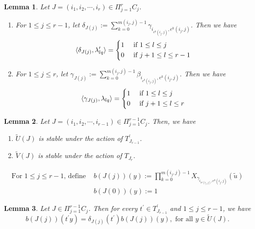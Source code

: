 \documentclass[10pt,a4paper]{amsart}
\newtheorem{lemma}{Lemma}
\begin{document}
\begin{lemma}\label{section:quotient:lemma 7}Let $J=(i_{1},i_{2},\cdots,i_{r})\in\Pi_{j=1}^{r}C_{j}$. 
	\begin{enumerate}
		\item 
		For $1\leq j\leq r-1$, 
		let $\delta_{J(j)}:=\sum_{k=0}^{m(i_{j},j)-1}\gamma_{i_{e^{k}(i_{j},j)},e^{k}(i_{j},j)}$. Then we have 
		\begin{align*}
			\langle\delta_{J(j)},\lambda^{\prime}_{lq}\rangle=\begin{dcases}
				1& \text{ if $1\leq l\leq j$}\\
				0& \text{ if $j+1\leq l\leq r-1$}
			\end{dcases}
		\end{align*}
		\item 	For $1\leq j\leq r$, 
		let $\gamma_{J(j)}:=\sum_{k=0}^{m(i_{j},j)-1}\beta_{i_{e^{k}(i_{j},j)},e^{k}(i_{j},j)}$. Then we have 
		\begin{align*}
			\langle\gamma_{J(j)},\lambda_{lq}\rangle=\begin{dcases}
				1& \text{ if $1\leq l\leq j$}\\
				0& \text{ if $j+1\leq l\leq r$}
			\end{dcases}
		\end{align*}
	\end{enumerate}
\end{lemma}

	\begin{lemma}\label{section: quotient lemma 5}
		Let	$J=(i_{1},i_{2},\cdots,i_{r-1})\in \Pi_{j=1}^{r-1}C_{j}$. Then, we have 
		\begin{enumerate}
			\item $\tilde{U}(J)$ is stable under the action of $T^{\prime}_{J_{r-1}}$.
			\item $\tilde{V}(J)$ is stable under the action of $T_{J_{r}}$.
		\end{enumerate}
	\end{lemma}

	\begin{align}
		\text{For $1\leq j\leq r-1$, define\ }&
		b(J(j))(y):=\prod_{k=0}^{m(i_{j},j)-1}X_{\gamma_{i_{e^{k}(i_{j},j)},e^{k}(i_{j},j)}}(\tilde{u})\label{eq 5.1.12}\\
		&b(J(0))(y):=1\label{eq 5.1.14}
	\end{align}

	\begin{lemma}\label{section:quotient:lemma 8}
		Let $J\in\Pi_{j=1}^{r-1}C_{j}$. Then for every $t^{\prime}\in T^{\prime}_{J_{r-1}}$ and $1\leq j\leq r-1$,  we have $$b(J(j))(t^{\prime}y)=\delta_{J(j)}(t^{\prime})b(J(j))(y),\text{\ for all $y\in \tilde{U}(J)$}.$$
	\end{lemma}
\end{document}
